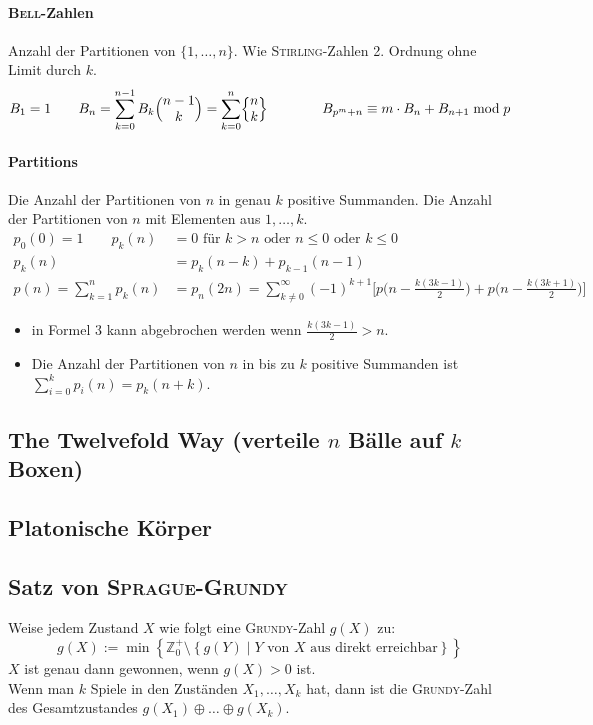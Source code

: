 \paragraph{\textsc{Bell}-Zahlen}
Anzahl der Partitionen von $\{1, \ldots, n\}$.
Wie \textsc{Stirling}-Zahlen 2. Ordnung ohne Limit durch $k$.
\[B_1 = 1 \qquad
B_n = \sum\limits_{k = 0}^{n - 1} B_k\Bigl( \begin{matrix} n-1 \\ k \end{matrix} \Bigr)
= \sum\limits_{k = 0}^{n}\Bigl\{ \begin{matrix} n \\ k \end{matrix} \Bigr\}\qquad\qquad B_{p^m+n}\equiv m\cdot B_n + B_{n+1} \bmod{p}\]

\paragraph{Partitions}
Die Anzahl der Partitionen von $n$ in genau $k$ positive Summanden.
Die Anzahl der Partitionen von $n$ mit Elementen aus ${1,\dots,k}$.
\begin{align*}
	p_0(0)=1 \qquad p_k(n)&=0 \text{ für } k > n \text{ oder } n \leq 0 \text{ oder } k \leq 0\\
	p_k(n)&= p_k(n-k) + p_{k-1}(n-1)\\[2pt]
	p(n)=\sum_{k=1}^{n} p_k(n)&=p_n(2n)=\sum\limits_{k\neq0}^\infty(-1)^{k+1}\bigg[p\bigg(n - \frac{k(3k-1)}{2}\bigg) + p\bigg(n - \frac{k(3k+1)}{2}\bigg)\bigg]
\end{align*}
\begin{itemize}
	\item in Formel $3$ kann abgebrochen werden wenn $\frac{k(3k-1)}{2} > n$.
	\item Die Anzahl der Partitionen von $n$ in bis zu $k$ positive Summanden ist $\sum\limits_{i=0}^{k}p_i(n)=p_k(n+k)$.
\end{itemize}

\subsection{The Twelvefold Way \textnormal{(verteile $n$ Bälle auf $k$ Boxen)}}


\subsection{Platonische Körper}




\subsection{Satz von \textsc{Sprague-Grundy}}
Weise jedem Zustand $X$ wie folgt eine \textsc{Grundy}-Zahl $g\left(X\right)$ zu:
\[
g\left(X\right) := \min\left\{
\mathbb{Z}_0^+ \setminus
\left\{g\left(Y\right) \mid Y \text{ von } X \text{ aus direkt erreichbar}\right\}
\right\}
\]
$X$ ist genau dann gewonnen, wenn $g\left(X\right) > 0$ ist.\\
Wenn man $k$ Spiele in den Zuständen $X_1, \ldots, X_k$ hat, dann ist die \textsc{Grundy}-Zahl des Gesamtzustandes $g\left(X_1\right) \oplus \ldots \oplus g\left(X_k\right)$.

